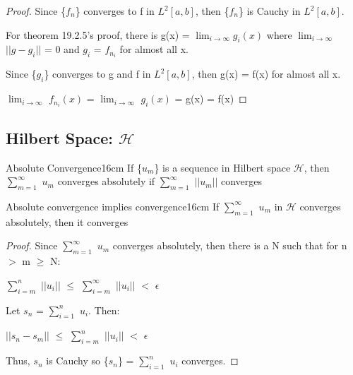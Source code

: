     \begin{proof}
        Since \{$f_n$\} converges to f in $L^2[a,b]$,
        then \{$f_n$\} is Cauchy in $L^2[a,b]$.

        For {\color{red} theorem 19.2.5}'s proof,
        there is g(x) = $\lim_{i \rightarrow \infty} g_i(x)$
        where $\lim_{i \rightarrow \infty}$ $||g-g_i||$ = 0 and
        $g_i$ = $f_{n_i}$ for almost all x.
        
        Since \{$g_i$\} converges to g and f in $L^2[a,b]$,
        then g(x) = f(x) for almost all x.

        \hspace{0.5cm}
        $\lim_{i \rightarrow \infty}$ $f_{n_i}(x)$
        = $\lim_{i \rightarrow \infty}$ $g_i(x)$
        = g(x) = f(x)
    \end{proof}

    \newpage





\subsection{ Hilbert Space: $\mathcal{H}$ }

    \begin{definition}{Absolute Convergence}{16cm}
        If \{$u_m$\} is a sequence in Hilbert space $\mathcal{H}$, then
        $\sum_{m=1}^{\infty}$ $u_m$ {\color{lblue} converges absolutely}
        if $\sum_{m=1}^{\infty}$ $||u_m||$ converges
    \end{definition}

    \vspace{0.5cm}



    \begin{wtheorem}{Absolute convergence implies convergence}{16cm}
        If $\sum_{m=1}^{\infty}$ $u_m$ in $\mathcal{H}$ converges absolutely, then
        it converges
    \end{wtheorem}

    \begin{proof}
        Since $\sum_{m=1}^{\infty}$ $u_m$ converges absolutely,
        then there is a N such that for n $>$ m $\geq$ N:

        \hspace{0.5cm}
        $\sum_{i=m}^n$ $||u_i||$
        $\leq$ $\sum_{i=m}^{\infty}$ $||u_i||$
        $<$ $\epsilon$

        Let $s_n$ = $\sum_{i=1}^n$ $u_i$. Then:

        \hspace{0.5cm}
        $||s_n - s_m||$
        $\leq$ $\sum_{i=m}^n$ $||u_i||$
        $<$ $\epsilon$

        Thus, $s_n$ is Cauchy so \{$s_n$\} = $\sum_{i=1}^n$ $u_i$ converges.
    \end{proof}

